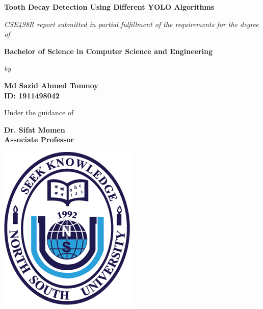 \begin{titlepage}
\begin{center}

{\selectfont
\huge \bfseries Tooth Decay Detection Using Different YOLO Algorithms}\\
\vspace*{1cm}

{\large  \itshape CSE498R report submitted in partial fulfillment of the requirements for the degree}\\
\vspace*{0.5cm}
{\large \itshape {of}}\\
\vspace*{0.5cm}

{\selectfont
\huge \bfseries Bachelor of Science in Computer Science and Engineering}\\
\vspace*{0.5cm}

{\large \itshape {by}}\\
\vspace*{0.5cm}
\begin{center}

{\large \bfseries Md Sazid Ahmed Tonmoy }\\
{\large \bfseries ID: 1911498042}\\
\par\end{center}
\vspace*{0.5cm}

{\large Under the guidance of\\}
\vspace*{0.2cm}

{\Large \bfseries Dr. Sifat Momen\\}
{\Large \bfseries Associate Professor\\}

\vspace*{1.0cm}

\includegraphics[scale=0.6]{nsu.png}
\vspace*{0.5cm}


\end{center}
\end{titlepage}
